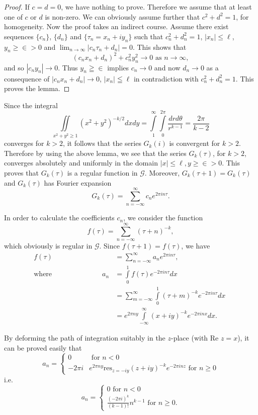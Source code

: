 \begin{proof}
If $c=d=0$, we have nothing to prove. Therefore we assume that at
least one of $c$ or $d$ is non-zero. We can obviously assume further
that $c^2+d^2=1$, for homogeneity. Now the proof takes an indirect
course. Assume there exist sequences $\{c_n\}$, $\{d_n\}$ and
$\{\tau_n = x_n + iy_n\}$ such that $c^2_n+d^2_n=1$, $|x_n|\leq \ell$,
$y_n \geq \in >0$ and $\lim_{n\to \infty}|c_n \tau_n +
d_n|=0$. This shows that 
$$
(c_nx_n + d_n)^2 + c^2_n y^2_n \to 0 \text{ as } n \to \infty,
$$
and so $|c_n y_n|\to 0$. Thus $y_n \geqq \in$ implies $c_n \to
0$ and now $d_n \to 0$ as a consequence of $|c_n x_n + d_n| \to 0$,
$|x_n|\leqq \ell$ in contradiction with $c^2_n+d^2_n=1$. This proves
the lemma.
\end{proof}

Since the integral 
$$
\iint\limits_{x^2+y^2\geq 1} (x^2+y^2)^{-k/2} dx dy =
\int\limits^{\infty}_{1} \int\limits^{2\pi}_{0}
\frac{drd\theta}{r^{k-1}} = \frac{2\pi}{k-2}
$$
converges for $k>2$, it follows that the series $G_k(i)$ is convergent
for $k>2$. Therefore by using the above lemma, we see that the series 
$G_k(\tau)$, \pageoriginale for $k>2$, converges absolutely and
uniformly in the domain $|x|\leq \ell, y \geq \in >0$. This
proves that $G_k(\tau)$ is a regular function in
$\mathscr{G}$. Moreover, $G_k(\tau+1)=G_k(\tau)$ and $G_k(\tau)$ has
Fourier expansion 
$$
G_k (\tau) = \sum^{\infty}_{n=-\infty} c_n e^{2\pi i n \tau}.
$$

In order to calculate the coefficients $c_n$, we consider the function 
$$
f(\tau) = \sum^{\infty}_{n=-\infty} (\tau+n)^{-k},
$$
which obviously is regular in $\mathscr{G}$. Since
$f(\tau+1)=f(\tau)$, we have
\begin{align*}
f(\tau) & = \sum^{\infty}_{n=-\infty} a_n e^{2 \pi i n \tau},\\
\text{where} \hspace{3cm} a_n & = \int\limits^1_{0} f(\tau) e^{-2\pi i
n \tau} dx\hspace{3cm}\\
& = \sum^{\infty}_{m=-\infty} \int\limits^1_0 (\tau+m)^{-k} e^{-2\pi i
n \tau} dx\\
& = e^{2\pi n y} \int\limits^{\infty}_{-\infty} (x+iy)^{-k} e^{-2\pi i
n x} dx .
\end{align*}

By deforming the path of integration suitably in the $z$-place (with
Re $z=x$), it can be proved easily that 
$$
a_n = \begin{cases}
0 & \text{ for } n <0\\
-2\pi i & e^{2\pi ny}  \text{res}_{z=-iy} (z+iy)^{-k} e^{-2\pi i nz}
\text{ for } n \geq 0
\end{cases}
$$
i.e. \pageoriginale
$$
a_n = \begin{cases}
0 \text{ for } n < 0\\
\frac{(-2\pi i)^k}{(k-1)!} n^{k-1} \text{ for } n \geq 0.
\end{cases}
$$

